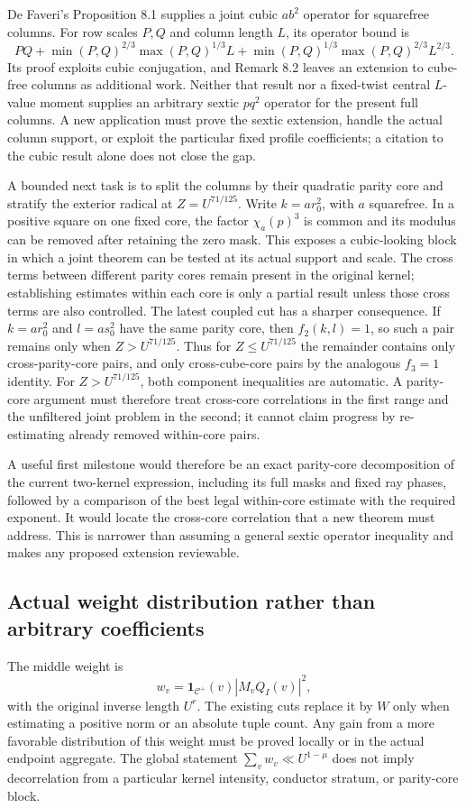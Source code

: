 \documentclass[11pt]{article}
\theoremstyle{definition}
\newcommand{\Id}{\mathbf 1}
\newcommand{\Cplus}{\mathcal C^+}
\begin{document}
De Faveri's Proposition 8.1 \cite{df} supplies a joint cubic $ab^2$ operator for squarefree columns. For row scales $P,Q$ and column length $L$, its operator bound is
\[
 PQ+\min(P,Q)^{2/3}\max(P,Q)^{1/3}L
 +\min(P,Q)^{1/3}\max(P,Q)^{2/3}L^{2/3}.
\] Its proof exploits cubic conjugation, and Remark 8.2 leaves an extension to cube-free columns as additional work. Neither that result nor a fixed-twist central $L$-value moment supplies an arbitrary sextic $pq^2$ operator for the present full columns. A new application must prove the sextic extension, handle the actual column support, or exploit the particular fixed profile coefficients; a citation to the cubic result alone does not close the gap.

A bounded next task is to split the columns by their quadratic parity core and stratify the exterior radical at $Z=U^{71/125}$. Write $k=a r_0^2$, with $a$ squarefree. In a positive square on one fixed core, the factor $\chi_a(p)^3$ is common and its modulus can be removed after retaining the zero mask. This exposes a cubic-looking block in which a joint theorem can be tested at its actual support and scale. The cross terms between different parity cores remain present in the original kernel; establishing estimates within each core is only a partial result unless those cross terms are also controlled. The latest coupled cut has a sharper consequence. If $k=a r_0^2$ and $l=a s_0^2$ have the same parity core, then $f_2(k,l)=1$, so such a pair remains only when $Z>U^{71/125}$. Thus for $Z\le U^{71/125}$ the remainder contains only cross-parity-core pairs, and only cross-cube-core pairs by the analogous $f_3=1$ identity. For $Z>U^{71/125}$, both component inequalities are automatic. A parity-core argument must therefore treat cross-core correlations in the first range and the unfiltered joint problem in the second; it cannot claim progress by re-estimating already removed within-core pairs.

A useful first milestone would therefore be an exact parity-core decomposition of the current two-kernel expression, including its full masks and fixed ray phases, followed by a comparison of the best legal within-core estimate with the required exponent. It would locate the cross-core correlation that a new theorem must address. This is narrower than assuming a general sextic operator inequality and makes any proposed extension reviewable.

\subsection{Actual weight distribution rather than arbitrary coefficients}
The middle weight is
\[
 w_v=\Id_{\Cplus}(v)|M_vQ_I(v)|^2,
\]
with the original inverse length $U^r$. The existing cuts replace it by $W$ only when estimating a positive norm or an absolute tuple count. Any gain from a more favorable distribution of this weight must be proved locally or in the actual endpoint aggregate. The global statement $\sum_vw_v\ll U^{1-\mu}$ does not imply decorrelation from a particular kernel intensity, conductor stratum, or parity-core block.
\end{document}

